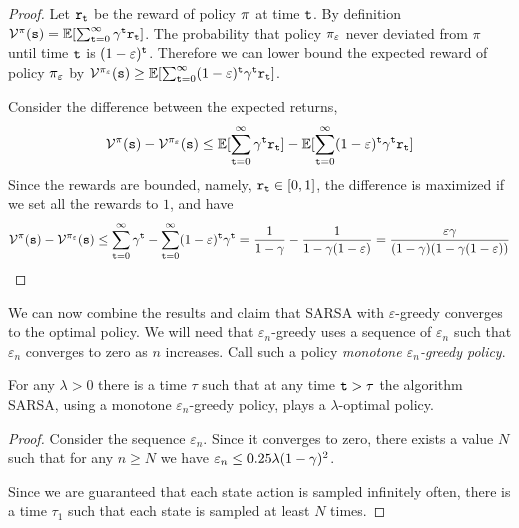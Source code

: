 \begin{advanced}
\begin{proof}
Let ${\tt r}_{\tt t}$ be the reward of policy $\pi$ at time
${\tt t}$. By definition
$\mathcal{V}^\pi({\tt s})=\mathbb{E}[\sum_{{\tt t}=0}^\infty
\gamma^{\tt t}{\tt r}_{\tt t}]$. The probability that policy
$\pi_\varepsilon$ never deviated from $\pi$ until time ${\tt t}$
is $(1-\varepsilon)^{\tt t}$. Therefore we can lower bound the
expected reward of policy $\pi_\varepsilon$ by
$\mathcal{V}^{\pi_\varepsilon}({\tt s})\geq \mathbb{E}[\sum_{{\tt t}=0}^\infty
(1-\varepsilon)^{\tt t}\gamma^{\tt t}{\tt r}_{\tt t}]$.

Consider the difference between the expected returns,
\[
\mathcal{V}^\pi({\tt s})- \mathcal{V}^{\pi_\varepsilon}({\tt s}) \leq
\mathbb{E}[\sum_{{\tt t}=0}^\infty \gamma^{\tt t}{\tt r}_{\tt t}] -
\mathbb{E}[\sum_{{\tt t}=0}^\infty
(1-\varepsilon)^{\tt t}\gamma^{\tt t}{\tt r}_{\tt t}]
\]
Since the rewards are bounded, namely, ${\tt r}_{\tt t}\in[0,1]$, the
difference is maximized if we set all the rewards to $1$, and have
\[
\mathcal{V}^\pi({\tt s})- \mathcal{V}^{\pi_\varepsilon}({\tt s}) \leq
\sum_{{\tt t}=0}^\infty \gamma^{\tt t} - \sum_{{\tt t}=0}^\infty
(1-\varepsilon)^{\tt t}\gamma^{\tt t}=
\frac{1}{1-\gamma}-\frac{1}{1-\gamma(1-\varepsilon)}=\frac{\varepsilon\gamma}{(1-\gamma)(1-\gamma(1-\varepsilon))}
\]
\end{proof}

We can now combine the results and claim that SARSA with
$\varepsilon$-greedy converges to the optimal policy. We will need
that $\varepsilon_n$-greedy uses a sequence of $\varepsilon_n$ such
that $\varepsilon_n$ converges to zero as $n$ increases. Call such a
policy \emph{monotone $\varepsilon_n$-greedy policy}.

\begin{theorem}
For any $\lambda>0$ there is a time $\tau$ such that at any time
${\tt t}>\tau$ the algorithm SARSA, using a monotone
$\varepsilon_n$-greedy policy, plays a $\lambda$-optimal policy.
\end{theorem}

\begin{proof}
Consider the sequence $\varepsilon_n$. Since it converges to zero, there exists a value $N$ such that for any $n\geq N$ we have $\varepsilon_n\leq 0.25\lambda(1-\gamma)^2$.

Since we are guaranteed that each state action is sampled infinitely
often, there is a time $\tau_1$ such that each state is sampled at
least $N$ times.


\end{proof}
\end{advanced}
